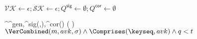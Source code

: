 \State$\mathcal{VK} \gets \epsilon; \mathcal{SK} \gets \epsilon;
       Q^\textsf{sig} \gets \emptyset;
       Q^\textsf{cor} \gets \emptyset$

  {^{^\textsf{gen},^\textsf{sig}(\cdot,\cdot),^\textsf{cor}(\cdot)}
    \left(
      \params
    \right)
  }
  \EndIf
\EndFor
\Return$\VerCombined(m, avk, \sigma) \land \Comprises(\keyseq, avk) \land q < t$
